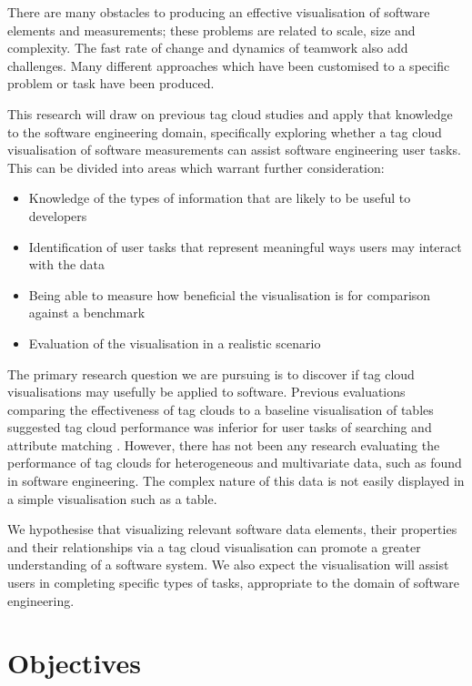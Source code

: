 There are many obstacles to producing an effective visualisation of software elements and measurements; these problems are related to scale, size and complexity. The fast rate of change and dynamics of teamwork also add challenges. Many different approaches which have been customised to a specific problem or task have been produced. 

This research will draw on previous tag cloud studies and apply that knowledge to the software engineering domain, specifically exploring whether a tag cloud visualisation of software measurements can assist software engineering user tasks. This can be divided into areas which warrant further consideration:

\begin{itemize}
	\item Knowledge of the types of information that are likely to be useful to developers
	\item Identification of user tasks that represent meaningful ways users may interact with the data
	\item Being able to measure how beneficial the visualisation is for comparison against a benchmark
	\item Evaluation of the visualisation in a realistic scenario
\end{itemize}

The primary research question we are pursuing is to discover if tag cloud visualisations may usefully be applied to software.  Previous evaluations comparing the effectiveness of tag clouds to a baseline visualisation of tables suggested tag cloud performance was inferior for user tasks of searching and attribute matching \cite{Oosterman10}. However, there has not been any research evaluating the performance of tag clouds for heterogeneous and multivariate data, such as found in software engineering. The complex nature of this data is not easily displayed in a simple visualisation such as a table.

We hypothesise that visualizing relevant software data elements, their properties and their relationships via a tag cloud visualisation can promote a greater understanding of a software system. We also expect the visualisation will assist users in completing specific types of tasks, appropriate to the domain of software engineering.

\section{Objectives}

